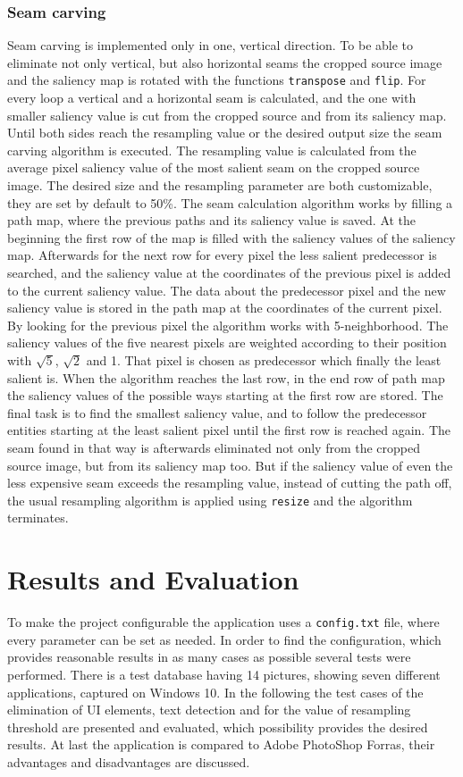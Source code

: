 \documentclass[draft,final]{vutinfth} %
\begin{document}
\subsection{Seam carving}
Seam carving is implemented only in one, vertical direction. 
To be able to eliminate not only vertical, but also horizontal seams the cropped source image and the saliency map is rotated with the functions \texttt{transpose} and \texttt{flip}.
For every loop a vertical and a horizontal seam is calculated, and the one with smaller saliency value is cut from the cropped source and from its saliency map.
Until both sides reach the resampling value or the desired output size the seam carving algorithm is executed.
The resampling value is calculated from the average pixel saliency value of the most salient seam on the cropped source image.
The desired size and the resampling parameter are both customizable, they are set by default to 50\%. 
The seam calculation algorithm works by filling a path map, where the previous paths and its saliency value is saved.
At the beginning the first row of the map is filled with the saliency values of the saliency map.
Afterwards for the next row for every pixel the less salient predecessor is searched, and the saliency value at the coordinates of the previous pixel is added to the current saliency value.
The data about the predecessor pixel and the new saliency value is stored in the path map at the coordinates of the current pixel.
By looking for the previous pixel the algorithm works with 5-neighborhood. 
The saliency values of the five nearest pixels are weighted according to their position with $\sqrt{5}$, $\sqrt{2}$ and 1.
That pixel is chosen as predecessor which finally the least salient is.
When the algorithm reaches the last row, in the end row of path map the saliency values of the possible ways starting at the first row are stored.
The final task is to find the smallest saliency value, and to follow the predecessor entities starting at the least salient pixel until the first row is reached again.
The seam found in that way is afterwards eliminated not only from the cropped source image, but from its saliency map too.
But if the saliency value of even the less expensive seam exceeds the resampling value, instead of cutting the path off, the usual resampling algorithm is applied using \texttt{resize} and the algorithm terminates.  

\chapter{Results and Evaluation}
To make the project configurable the application uses a \texttt{config.txt} file, where every parameter can be set as needed.
In order to find the configuration, which provides reasonable results in as many cases as possible several tests were performed.
There is a test database having 14 pictures, showing seven different applications, captured on Windows 10.
In the following the test cases of the elimination of UI elements, text detection and for the value of resampling threshold are presented and evaluated, which possibility provides the desired results.
At last the application is compared to Adobe PhotoShop Forras, their advantages and disadvantages are discussed.
\end{document}

